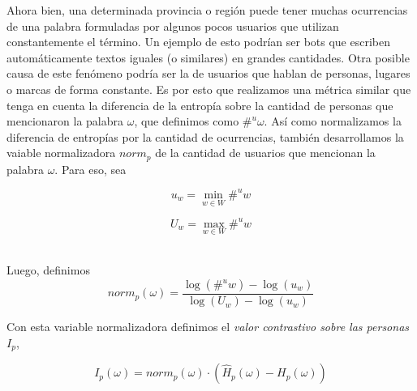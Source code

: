 Ahora bien, una determinada provincia o región puede tener muchas ocurrencias de una palabra formuladas por algunos pocos usuarios que utilizan constantemente el término. Un ejemplo de esto podrían ser bots que escriben automáticamente textos iguales (o similares) en grandes cantidades. Otra posible causa de este fenómeno podría ser la de usuarios que hablan de personas, lugares o marcas de forma constante.
Es por esto que realizamos una métrica similar que tenga en cuenta la diferencia de la entropía sobre la cantidad de personas que mencionaron la palabra $\omega$, que definimos como $\#^u \omega$. Así como normalizamos la diferencia de entropías por la cantidad de ocurrencias, también desarrollamos la vaiable normalizadora $norm_p$ de la cantidad de usuarios que mencionan la palabra $\omega$. 
Para eso, sea %

\noindent\begin{minipage}{.5\linewidth}
\begin{equation}
  u_w = \min \limits_{w \in W} \#^u w
\end{equation}
\end{minipage}%
\begin{minipage}{.5\linewidth}
\begin{equation}
  U_w = \max \limits_{w \in W} \#^u w
\end{equation}
\end{minipage}\\

Luego, definimos
\begin{equation}
norm_p(\omega) = \frac{\log\left(\#^u w\right) - \log \left(u_w\right)}{\log\left(U_w\right) - \log\left(u_w\right)}  
\label{eq:norm2}
\end{equation}

Con esta variable normalizadora definimos el \textit{valor contrastivo sobre las personas} $I_p$,

\begin{equation}
I_p(\omega) = norm_p(\omega) \cdot (\widehat{H}_p(\omega) - H_p(\omega))
\label{eq:iu}
\end{equation}


